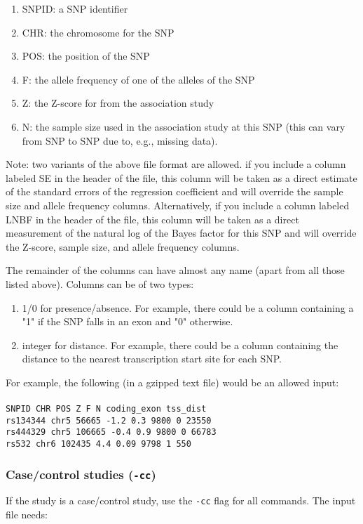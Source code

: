 \documentclass[11pt,titlepage]{article}
\begin{document}
\begin{enumerate}
\item SNPID: a SNP identifier
\item CHR: the chromosome for the SNP
\item POS: the position of the SNP
\item F: the allele frequency of one of the alleles of the SNP
\item Z: the Z-score for from the association study
\item N: the sample size used in the association study at this SNP (this can vary from SNP to SNP due to, e.g., missing data).
\end{enumerate}

Note: two variants of the above file format are allowed. if you include a column labeled SE in the header of the file, this column will be taken as a direct estimate of the standard errors of the regression coefficient and will override the sample size and allele frequency columns. Alternatively, if you include a column labeled LNBF in the header of the file, this column will be taken as a direct measurement of the natural log of the Bayes factor for this SNP and will override the Z-score, sample size, and allele frequency columns.

The remainder of the columns can have almost any name (apart from all those listed above). Columns can be of two types:

\begin{enumerate}
\item 1/0 for presence/absence. For example, there could be a column containing a "1" if the SNP falls in an exon and "0" otherwise.
\item integer for distance. For example, there could be a column containing the distance to the nearest transcription start site for each SNP.
\end{enumerate}

\noindent For example, the following (in a gzipped text file) would be an allowed input:
\\
\\
\noindent \texttt{SNPID CHR POS Z F N coding\_exon tss\_dist}\\
\texttt{rs134344 chr5 56665 -1.2 0.3 9800 0 23550}\\
\texttt{rs444329 chr5 106665 -0.4 0.9 9800 0 66783}\\
\texttt{rs532 chr6 102435 4.4 0.09 9798 1 550}

\subsubsection{Case/control studies (\texttt{-cc})}\label{cc}
If the study is a case/control study, use the \texttt{-cc} flag for all commands. The input file needs:
\end{document}
